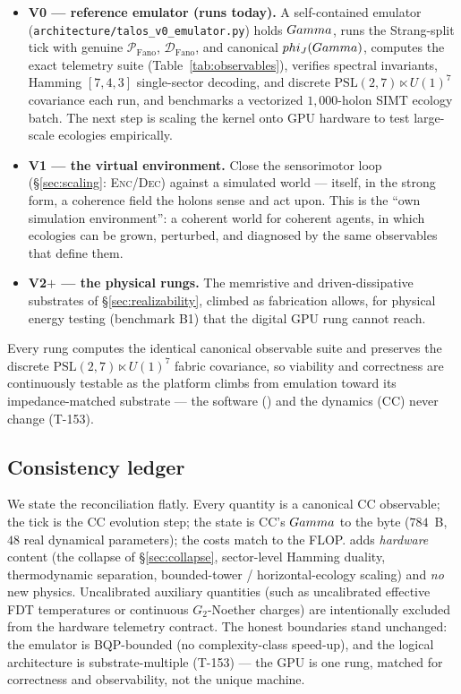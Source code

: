 \begin{itemize}[leftmargin=1.5em,itemsep=1pt]
  \item \textbf{V0 --- reference emulator (runs today).} A self-contained
        emulator (\texttt{architecture/talos\_v0\_emulator.py}) holds $Gamma$,
        runs the Strang-split tick with genuine $\mathcal{P}_{\mathrm{Fano}}$,
        $\mathcal{D}_{\mathrm{Fano}}$, and canonical $phi_J(Gamma)$,
        computes the exact telemetry suite (Table~\ref{tab:observables}),
        verifies spectral invariants, Hamming $[7,4,3]$ single-sector decoding,
        and discrete $\mathrm{PSL}(2,7)\ltimes U(1)^7$ covariance each run, and
        benchmarks a vectorized $1{,}000$-holon SIMT ecology batch. The next
        step is scaling the kernel onto GPU hardware to test large-scale
        ecologies empirically.
  \item \textbf{V1 --- the virtual environment.} Close the sensorimotor loop
        (\S\ref{sec:scaling}: \textsc{Enc}/\textsc{Dec}) against a simulated
        world --- itself, in the strong form, a coherence field the holons sense
        and act upon. This is the ``own simulation environment'': a coherent
        world for coherent agents, in which ecologies can be grown, perturbed,
        and diagnosed by the same observables that define them.
  \item \textbf{V2$+$ --- the physical rungs.} The memristive and
        driven-dissipative substrates of \S\ref{sec:realizability}, climbed as
        fabrication allows, for physical energy testing (benchmark B1) that the
        digital GPU rung cannot reach.
\end{itemize}

\noindent Every rung computes the identical canonical observable suite and
preserves the discrete $\mathrm{PSL}(2,7)\ltimes U(1)^7$ fabric covariance, so
viability and correctness are continuously testable as the platform climbs from
emulation toward its impedance-matched substrate --- the software (\SYNARC{})
and the dynamics (CC) never change (T-153).

\subsection{Consistency ledger}
\label{subsec:ledger}

We state the reconciliation flatly. Every \TALOS{} quantity is a canonical CC
observable; the tick is the CC evolution step; the state is CC's $Gamma$ to the
byte ($784$~B, $48$ real dynamical parameters); the costs match to the FLOP.
\TALOS{} adds \emph{hardware} content (the collapse of \S\ref{sec:collapse},
sector-level Hamming duality, thermodynamic separation, bounded-tower /
horizontal-ecology scaling) and \emph{no} new physics. Uncalibrated auxiliary
quantities (such as uncalibrated effective FDT temperatures or continuous
$G_2$-Noether charges) are intentionally excluded from the hardware telemetry
contract. The honest boundaries stand unchanged: the emulator is BQP-bounded
(no complexity-class speed-up), and the logical architecture is
substrate-multiple (T-153) --- the GPU is one rung, matched for correctness and
observability, not the unique machine.
